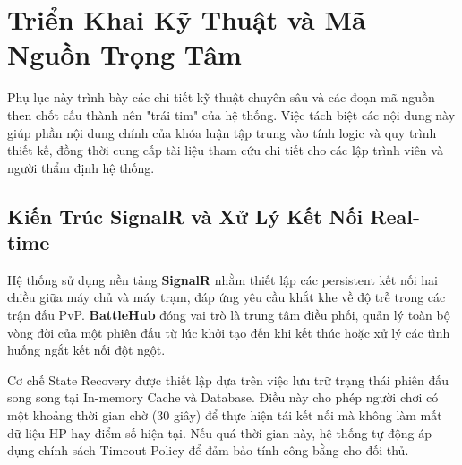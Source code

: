 
\appendix

\chapter{Triển Khai Kỹ Thuật và Mã Nguồn Trọng Tâm}
\label{appendix_code}

Phụ lục này trình bày các chi tiết kỹ thuật chuyên sâu và các đoạn mã nguồn then chốt cấu thành nên "trái tim" của hệ thống. Việc tách biệt các nội dung này giúp phần nội dung chính của khóa luận tập trung vào tính logic và quy trình thiết kế, đồng thời cung cấp tài liệu tham cứu chi tiết cho các lập trình viên và người thẩm định hệ thống.

\section{Kiến Trúc SignalR và Xử Lý Kết Nối Real-time}

Hệ thống sử dụng nền tảng \textbf{SignalR} nhằm thiết lập các persistent kết nối hai chiều giữa máy chủ và máy trạm, đáp ứng yêu cầu khắt khe về độ trễ trong các trận đấu PvP. \textbf{BattleHub} đóng vai trò là trung tâm điều phối, quản lý toàn bộ vòng đời của một phiên đấu từ lúc khởi tạo đến khi kết thúc hoặc xử lý các tình huống ngắt kết nối đột ngột.

Cơ chế State Recovery được thiết lập dựa trên việc lưu trữ trạng thái phiên đấu song song tại In-memory Cache và Database. Điều này cho phép người chơi có một khoảng thời gian chờ (30 giây) để thực hiện tái kết nối mà không làm mất dữ liệu HP hay điểm số hiện tại. Nếu quá thời gian này, hệ thống tự động áp dụng chính sách Timeout Policy để đảm bảo tính công bằng cho đối thủ.


